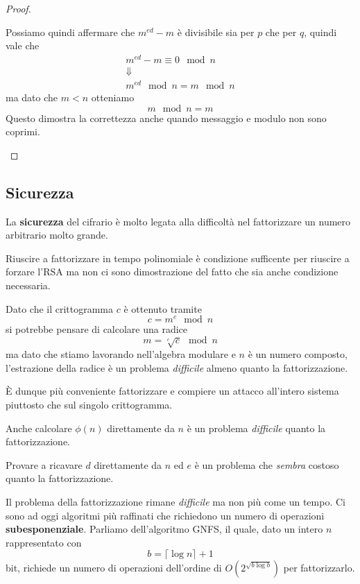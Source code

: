 \begin{proof}
\begin{enumerate}
		      Possiamo quindi affermare che $m^{ed} - m$ \`e divisibile sia per $p$ che per $q$, quindi vale che
		      \begin{gather*}
			      m^{ed} - m \equiv 0 \mod{n} \\
			      \Downarrow \\
			      m^{ed} \mod{n} = m \mod{n}
		      \end{gather*}
		      ma dato che $m < n$ otteniamo
		      \[ m \mod{n} = m \]
		      Questo dimostra la correttezza anche quando messaggio e modulo non sono coprimi.
	\end{enumerate}
\end{proof}

\subsection{Sicurezza}
La \textbf{sicurezza} del cifrario \`e molto legata alla difficolt\`a nel fattorizzare un numero arbitrario molto
grande.

Riuscire a fattorizzare in tempo polinomiale \`e condizione sufficente per riuscire a forzare l'RSA ma non ci sono
dimostrazione del fatto che sia anche condizione necessaria.

Dato che il crittogramma $c$ \`e ottenuto tramite
\[ c = m^e \mod{n} \]
si potrebbe pensare di calcolare una radice
\[ m = \sqrt[e]{c} \mod{n} \]
ma dato che stiamo lavorando nell'algebra modulare e $n$ \`e un numero composto, l'estrazione della radice \`e un
problema \emph{difficile} almeno quanto la fattorizzazione.

\`E dunque pi\`u conveniente fattorizzare e compiere un attacco all'intero sistema piuttosto che sul singolo
crittogramma.

Anche calcolare $\phi(n)$ direttamente da $n$ \`e un problema \emph{difficile} quanto la fattorizzazione.

Provare a ricavare $d$ direttamente da $n$ ed $e$ \`e un problema che \emph{sembra} costoso quanto la
fattorizzazione.

Il problema della fattorizzazione rimane \emph{difficile} ma non pi\`u come un tempo. Ci sono ad oggi algoritmi
pi\`u raffinati che richiedono un numero di operazioni \textbf{subesponenziale}. Parliamo dell'algoritmo GNFS, il
quale, dato un intero $n$ rappresentato con
\[ b = \lceil \log n \rceil + 1 \]
bit, richiede un numero di operazioni dell'ordine di $O(2^{\sqrt{b \log b}})$ per fattorizzarlo.

